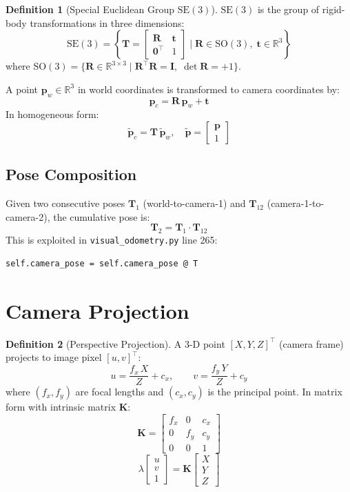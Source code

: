 \documentclass[12pt,a4paper,twoside]{report}
\theoremstyle{definition}
\newtheorem{definition}{Definition}[chapter]
\newcommand{\vect}[1]{\bm{#1}}
\newcommand{\mat}[1]{\mathbf{#1}}
\newcommand{\R}{\mathbb{R}}
\newcommand{\T}{\top}           %
\newcommand{\SE}{\mathrm{SE}(3)}
\newcommand{\SO}{\mathrm{SO}(3)}
\newcommand{\file}[1]{\texttt{\textcolor{codeblue}{#1}}}
\begin{document}
\begin{definition}[Special Euclidean Group $\SE$]
$\SE$ is the group of rigid-body transformations in three dimensions:
\[
  \SE = \left\{ \mat{T} = \begin{bmatrix} \mat{R} & \vect{t} \\ \vect{0}^\T & 1 \end{bmatrix}
         \;\Bigg|\; \mat{R} \in \SO,\; \vect{t} \in \R^3 \right\}
\]
where $\SO = \{\mat{R}\in\R^{3\times3} \mid \mat{R}^\T\mat{R}=\mat{I},\;\det\mat{R}=+1\}$.
\end{definition}

\noindent A point $\vect{p}_w \in \R^3$ in world coordinates is transformed to
camera coordinates by:
\[
  \vect{p}_c = \mat{R}\,\vect{p}_w + \vect{t}
\]
In homogeneous form:
\[
  \tilde{\vect{p}}_c = \mat{T}\,\tilde{\vect{p}}_w, \quad
  \tilde{\vect{p}} = \begin{bmatrix} \vect{p} \\ 1 \end{bmatrix}
\]

\subsection{Pose Composition}

Given two consecutive poses $\mat{T}_1$ (world-to-camera-1) and
$\mat{T}_{12}$ (camera-1-to-camera-2), the cumulative pose is:
\[
  \mat{T}_2 = \mat{T}_1 \cdot \mat{T}_{12}
\]
This is exploited in \file{visual\_odometry.py} line 265:
\begin{lstlisting}
self.camera_pose = self.camera_pose @ T
\end{lstlisting}

\section{Camera Projection}

\begin{definition}[Perspective Projection]
A 3-D point $[X,Y,Z]^\T$ (camera frame) projects to image pixel $[u,v]^\T$:
\[
  u = \frac{f_x\,X}{Z} + c_x, \qquad v = \frac{f_y\,Y}{Z} + c_y
\]
where $(f_x,f_y)$ are focal lengths and $(c_x,c_y)$ is the principal point.
In matrix form with intrinsic matrix $\mat{K}$:
\[
  \mat{K} = \begin{bmatrix} f_x & 0 & c_x \\ 0 & f_y & c_y \\ 0 & 0 & 1 \end{bmatrix}
\]
\[
  \lambda\begin{bmatrix}u\\v\\1\end{bmatrix} = \mat{K}\begin{bmatrix}X\\Y\\Z\end{bmatrix}
\]
\end{definition}
\end{document}
